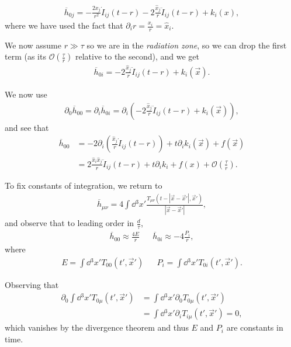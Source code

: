 \begin{align}
    \overline{h}_{0j} = -\frac{2x_{j}}{r^2} \dot{I}_{ij}\left( t - r \right) - 2 \frac{\hat{x}_j}{r} \ddot{I}_{ij}\left( t - r \right) + k_{i} \left( x \right) 
,\end{align}
where we have used the fact that $\partial_i r = \frac{x_{i}}{r} = \hat{x}_i$.

We now assume $r \gg \tau$ so we are in the \textit{radiation zone}, so we can drop the first term (as its $\mathcal{O}\left( \frac{\tau}{r} \right) $ relative to the second), and we get
\begin{align}
    \overline{h}_{0i} = -2 \frac{\hat{x}_j}{r} \ddot{I}_{ij}\left( t - r \right) + k_{i} \left( \vec{x} \right) 
.\end{align}

We now use 
\begin{align}
    \partial_0 \overline{h}_{00} = \partial_i \overline{h}_{0i} = \partial_i \left( -2 \frac{\hat{x}_j}{r} \ddot{I}_{ij}\left( t - r \right) + k_{i} \left( \vec{x} \right) \right) 
,\end{align}
and see that
\begin{align}
    \overline{h}_{00} &= -2 \partial_i \left( \frac{\hat{x}_j}{r} \dot{I}_{ij}\left( t - r \right)  \right) + t \partial_i k_i \left( \vec{x} \right) + f\left( \vec{x} \right)  \\
    &= 2 \frac{\hat{x}_i \hat{x}_j}{r} \ddot{I}_{ij} \left( t - r \right) + t \partial_i k_i + f\left( x \right) + \mathcal{O}\left( \frac{\tau}{r} \right) 
.\end{align}

To fix constants of integration, we return to
\begin{align}
    \overline{h}_{\mu \nu} = 4 \int \dd{^3x'} \frac{T_{\mu \nu} \left( t- \left| \vec{x} - \vec{x}' \right| , \vec{x}' \right) }{\left| \vec{x} - \vec{x}' \right| }
,\end{align}
and observe that to leading order in $\frac{d}{\tau}$,
\begin{align}
    \overline{h}_{00} \approx \frac{4E}{r} && \overline{h}_{0i} \approx -4 \frac{P_{i}}{r}
,\end{align}
where
\begin{align}
    E = \int \dd{^3x'} T_{00} \left( t', \vec{x}' \right)  && P_i = \int \dd{^3x'} T_{0i}\left( t', \vec{x}' \right) 
.\end{align}

Observing that
\begin{align}
    \partial_0 \int \dd{^3x'} T_{0 \mu} \left( t', \vec{x}' \right) &= \int \dd{^3x'} \partial_0 T_{0 \mu}\left( t', \vec{x}' \right)  \\
    &= \int \dd{^3x'} \partial_i T_{i \mu}\left( t' , \vec{x}' \right) = 0
,\end{align}
which vanishes by the divergence theorem and thus $E$ and $P_i$ are constants in time.

